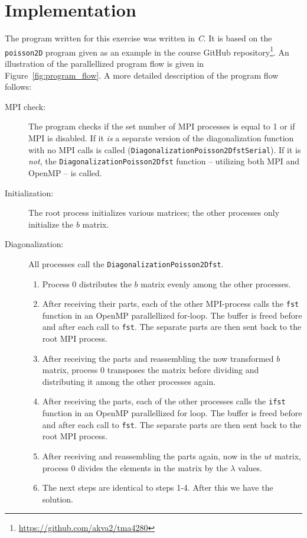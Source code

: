 
\section{Implementation} %
\label{sec:implementation}
The program written for this exercise was written in \emph{C}. It is based on the \texttt{poisson2D} program given as an example in the course GitHub repository\footnote{\url{https://github.com/akva2/tma4280}}. An illustration of the parallellized program flow is given in Figure~\ref{fig:program_flow}. A more detailed description of the program flow follows:
\begin{description}
  \item [MPI check:] The program checks if the set number of MPI processes is equal to 1 or if MPI is disabled. If it \emph{is} a separate version of the diagonalization function with no MPI calls is called (\texttt{DiagonalizationPoisson2DfstSerial}). If it is \emph{not}, the \texttt{DiagonalizationPoisson2Dfst} function -- utilizing both MPI and OpenMP -- is called.
  \item [Initialization:] The root process initializes various matrices; the other processes only initialize the $b$ matrix.
  \item [Diagonalization:] All processes call the \texttt{DiagonalizationPoisson2Dfst}.
  \begin{enumerate}
    \item Process 0 distributes the $b$ matrix evenly among the other processes.
    \item After receiving their parts, each of the other MPI-process calls the \texttt{fst} function in an OpenMP parallellized for-loop. The buffer is freed before and after each call to \texttt{fst}. The separate parts are then sent back to the root MPI process.
    \item After receiving the parts and reassembling the now transformed $b$ matrix, process 0 transposes the matrix before dividing and distributing it among the other processes again.
    \item After receiving the parts, each of the other processes calls the \texttt{ifst} function in an OpenMP parallellized for loop. The buffer is freed before and after each call to \texttt{fst}. The separate parts are then sent back to the root MPI process.
    \item After receiving and reassembling the parts again, now in the $ut$ matrix, process 0 divides the elements in the matrix by the $\lambda$ values.
    \item The next steps are identical to steps 1-4. After this we have the solution.
  \end{enumerate}
\end{description}

